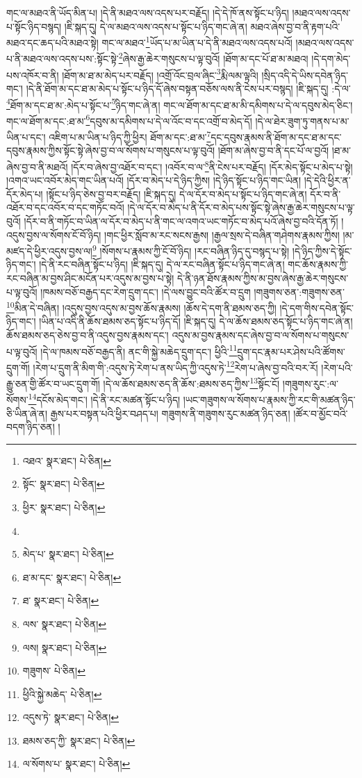 གང་ལ་མཐའ་ནི་ཡོད་མིན་པ། །དེ་ནི་མཐའ་ལས་འདས་པར་བརྗོད། །དེ་དེ་ཁོ་ནས་སྟོང་པ་ཉིད། །མཐའ་ལས་འདས་པ་སྟོང་ཉིད་བསྙད། །ཇི་སྐད་དུ། དེ་ལ་མཐའ་ལས་འདས་པ་སྟོང་པ་ཉིད་གང་ཞེ་ན། མཐའ་ཞེས་བྱ་བ་ནི་རྟག་པའི་མཐའ་དང་ཆད་པའི་མཐའ་སྟེ། གང་ལ་མཐའ་\footnote{འཐའ་  སྣར་ཐང་།  པེ་ཅིན། }ཡོད་པ་མ་ཡིན་པ་དེ་ནི་མཐའ་ལས་འདས་པའོ། །མཐའ་ལས་འདས་པ་ནི་མཐའ་ལས་འདས་པས་:སྟོང་སྟེ་\footnote{སྟོང་  སྣར་ཐང་།  པེ་ཅིན། }ཞེས་རྒྱ་ཆེར་གསུངས་པ་ལྟ་བུའོ། །ཐོག་མ་དང་པོ་ཐ་མ་མཐའ། །དེ་དག་མེད་པས་འཁོར་བ་ནི། །ཐོག་མ་ཐ་མ་མེད་པར་བརྗོད། །འགྲོ་འོང་བྲལ་ཞིང་\footnote{ཕྱིར་  སྣར་ཐང་།  པེ་ཅིན། }རྨི་ལམ་ལྟའི། །སྲིད་འདི་དེ་ཡིས་དབེན་ཉིད་གང་། །དེ་ནི་ཐོག་མ་དང་ཐ་མ་མེད་པ་སྟོང་པ་ཉིད་དོ་ཞེས་བསྟན་བཅོས་ལས་ནི་ངེས་པར་བསྙད། །ཇི་སྐད་དུ། :དེ་ལ་\footnote{}ཐོག་མ་དང་ཐ་མ་:མེད་པ་སྟོང་པ་\footnote{མེད་པ་  སྣར་ཐང་།  པེ་ཅིན། }ཉིད་གང་ཞེ་ན། གང་ལ་ཐོག་མ་དང་ཐ་མ་མི་དམིགས་པ་དེ་ལ་དབུས་མེད་ཅིང་། གང་ལ་ཐོག་མ་དང་:ཐ་མ་\footnote{ཐ་མ་དང་  སྣར་ཐང་།  པེ་ཅིན། }དབུས་མ་དམིགས་པ་དེ་ལ་འོང་བ་དང་འགྲོ་བ་མེད་དོ། །དེ་ལ་ཐེར་ཟུག་ཏུ་གནས་པ་མ་ཡིན་པ་དང་། འཇིག་པ་མ་ཡིན་པ་ཉིད་ཀྱི་ཕྱིར། ཐོག་མ་དང་:ཐ་མ་\footnote{ཐ་  སྣར་ཐང་།  པེ་ཅིན། }དང་དབུས་རྣམས་ནི་ཐོག་མ་དང་ཐ་མ་དང་དབུས་རྣམས་ཀྱིས་སྟོང་སྟེ་ཞེས་བྱ་བ་ལ་སོགས་པ་གསུངས་པ་ལྟ་བུའོ། །ཐོག་མ་ཞེས་བྱ་བ་ནི་དང་པོ་ལ་བྱའོ། །ཐ་མ་ཞེས་བྱ་བ་ནི་མཐའོ། །དོར་བ་ཞེས་བྱ་འཐོར་བ་དང་། །འབོར་བ་ལ་\footnote{ལས་  སྣར་ཐང་།  པེ་ཅིན། }ནི་ངེས་པར་བརྗོད། །དོར་མེད་སྟོང་པ་མེད་པ་སྟེ། །འགའ་ཡང་འབོར་མེད་གང་ཡིན་པའོ། །དོར་བ་མེད་པ་དེ་ཉིད་ཀྱིས། །དེ་ཉིད་སྟོང་པ་ཉིད་གང་ཡིན། །དེ་དེའི་ཕྱིར་ན་དོར་མེད་པ། །སྟོང་པ་ཉིད་ཅེས་བྱ་བར་བརྗོད། །ཇི་སྐད་དུ། དེ་ལ་དོར་བ་མེད་པ་སྟོང་པ་ཉིད་གང་ཞེ་ན། དོར་བ་ནི་འཐོར་བ་དང་འབོར་བ་དང་གཏོང་བའོ། །དེ་ལ་དོར་བ་མེད་པ་ནི་དོར་བ་མེད་པས་སྟོང་སྟེ་ཞེས་རྒྱ་ཆེར་གསུངས་པ་ལྟ་བུའོ། །དོར་བ་ནི་གཏོང་བ་ཡིན་ལ་དོར་བ་མེད་པ་ནི་གང་ལ་འགའ་ཡང་གཏོང་བ་མེད་པའོ་ཞེས་བྱ་བའི་དོན་ཏོ། །འདུས་བྱས་ལ་སོགས་ངོ་བོ་ཉིད། །གང་ཕྱིར་སློབ་མ་རང་སངས་རྒྱས། །རྒྱལ་སྲས་དེ་བཞིན་གཤེགས་རྣམས་ཀྱིས། །མ་མཛད་དེ་ཕྱིར་འདུས་བྱས་ལ།\footnote{ལས།  སྣར་ཐང་།  པེ་ཅིན། } །སོགས་པ་རྣམས་ཀྱི་ངོ་བོ་ཉིད། །རང་བཞིན་ཉིད་དུ་བསྙད་པ་སྟེ། །དེ་ཉིད་ཀྱིས་དེ་སྟོང་ཉིད་གང་། །དེ་ནི་རང་བཞིན་སྟོང་པ་ཉིད། །ཇི་སྐད་དུ། དེ་ལ་རང་བཞིན་སྟོང་པ་ཉིད་གང་ཞེ་ན། གང་ཆོས་རྣམས་ཀྱི་རང་བཞིན་མ་བྱས་ཤིང་མངོན་པར་འདུས་མ་བྱས་པ་སྟེ། དེ་ནི་ཉན་ཐོས་རྣམས་ཀྱིས་མ་བྱས་ཞེས་རྒྱ་ཆེར་གསུངས་པ་ལྟ་བུའོ། །ཁམས་བཅོ་བརྒྱད་དང་རེག་དྲུག་དང་། །དེ་ལས་བྱུང་བའི་ཚོར་བ་དྲུག །གཟུགས་ཅན་:གཟུགས་ཅན་\footnote{གཟུགས་  པེ་ཅིན། }མིན་དེ་བཞིན། །འདུས་བྱས་འདུས་མ་བྱས་ཆོས་རྣམས། །ཆོས་དེ་དག་ནི་ཐམས་ཅད་ཀྱི། །དེ་དག་གིས་དབེན་སྟོང་ཉིད་གང་། །ཡིན་པ་འདི་ནི་ཆོས་ཐམས་ཅད་སྟོང་པ་ཉིད་དོ། །ཇི་སྐད་དུ། དེ་ལ་ཆོས་ཐམས་ཅད་སྟོང་པ་ཉིད་གང་ཞེ་ན། ཆོས་ཐམས་ཅད་ཅེས་བྱ་བ་ནི་འདུས་བྱས་རྣམས་དང་། འདུས་མ་བྱས་རྣམས་དང་ཞེས་བྱ་བ་ལ་སོགས་པ་གསུངས་པ་ལྟ་བུའོ། །དེ་ལ་ཁམས་བཅོ་བརྒྱད་ནི། ནང་གི་སྐྱེ་མཆེད་དྲུག་དང་། ཕྱིའི་\footnote{ཕྱིའི་སྐྱེ་མཆེད་  པེ་ཅིན། }དྲུག་དང་རྣམ་པར་ཤེས་པའི་ཚོགས་དྲུག་གོ། །རེག་པ་དྲུག་ནི་མིག་གི་:འདུས་ཏེ་རེག་པ་ནས་ཡིད་ཀྱི་འདུས་ཏེ་\footnote{འདུས་ཏེ་  སྣར་ཐང་།  པེ་ཅིན། }རེག་པ་ཞེས་བྱ་བའི་བར་རོ། །རེག་པའི་རྒྱུ་ཅན་གྱི་ཚོར་བ་ཡང་དྲུག་གོ། །དེ་ལ་ཆོས་ཐམས་ཅད་ནི་ཆོས་:ཐམས་ཅད་ཀྱིས་\footnote{ཐམས་ཅད་ཀྱི་  སྣར་ཐང་།  པེ་ཅིན། }སྟོང་ངོ། །གཟུགས་རུང་:ལ་སོགས་\footnote{ལ་སོགས་པ་  སྣར་ཐང་།  པེ་ཅིན། }དངོས་མེད་གང་། །དེ་ནི་རང་མཚན་སྟོང་པ་ཉིད། །ཡང་གཟུགས་ལ་སོགས་པ་རྣམས་ཀྱི་རང་གི་མཚན་ཉིད་ཅི་ཡིན་ཞེ་ན། རྒྱས་པར་བསྟན་པའི་ཕྱིར་བཤད་པ། གཟུགས་ནི་གཟུགས་རུང་མཚན་ཉིད་ཅན། །ཚོར་བ་མྱོང་བའི་བདག་ཉིད་ཅན། །
